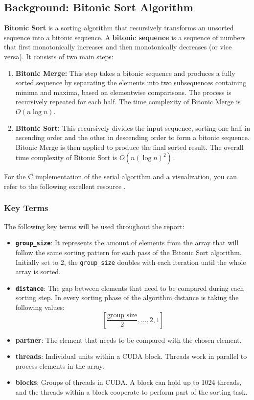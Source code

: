 \documentclass[a4paper,12pt]{article}
\begin{document}
\subsection{Background: Bitonic Sort Algorithm}  
\textbf{Bitonic Sort} is a sorting algorithm that recursively transforms an unsorted sequence into a bitonic sequence. A \textbf{bitonic sequence} is a sequence of numbers that first monotonically increases and then monotonically decreases (or vice versa). It consists of two main steps: 
\begin{enumerate}
 \item \textbf{Bitonic Merge:} This step takes a bitonic sequence and produces a fully sorted sequence by separating the elements into two subsequences containing minima and maxima, based on elementwise comparisons. The process is recursively repeated for each half. The time complexity of Bitonic Merge is \(O(n \log n)\).  

\item \textbf{Bitonic Sort:} This recursively divides the input sequence, sorting one half in ascending order and the other in descending order to form a bitonic sequence. Bitonic Merge is then applied to produce the final sorted result. The overall time complexity of Bitonic Sort is \(O(n (\log n)^2)\).  
\end{enumerate}
For the C implementation of the serial algorithm and a visualization, you can refer to the following excellent resource \cite{sortvisualizer}.

\subsubsection*{Key Terms}
The following key terms will be used throughout the report:
\begin{itemize}
    \item \textbf{\texttt{group\_size}}: It represents the amount of elements from the array that will follow the same sorting pattern for each pass of the Bitonic Sort algorithm. Initially set to 2, the \texttt{group\_size} doubles with each iteration until the whole array is sorted.
    \item \textbf{\texttt{distance}}: The gap between elements that need to be compared during each sorting step. In every sorting phase of the algorithm distance is taking the following values:
    \[
    \left[ \frac{\text{group\_size}}{2}, \dots, 2, 1 \right]
    \]
    \item \textbf{partner}: The element that needs to be compared with the chosen element. 
    \item \textbf{threads}: Individual units within a CUDA block. Threads work in parallel to process elements in the array.
    \item \textbf{blocks}: Groups of threads in CUDA. A block can hold up to 1024 threads, and the threads within a block cooperate to perform part of the sorting task.
\end{itemize}
\end{document}
